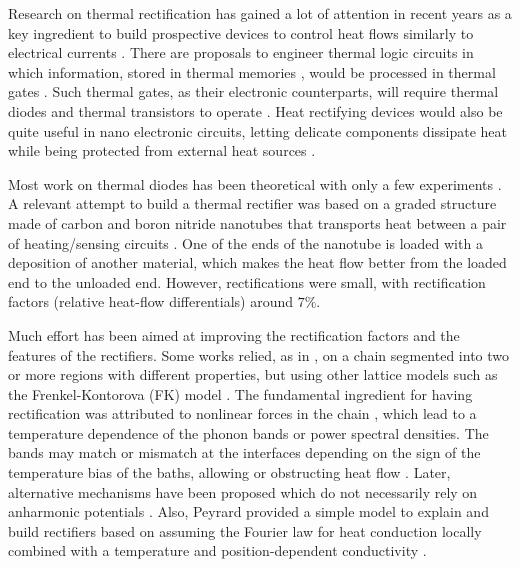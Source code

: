 Research on thermal rectification has gained a lot of attention in recent years as a key ingredient to build
prospective devices to control heat flows similarly to electrical currents \cite{Roberts2011,Li2012}. There are  proposals
to engineer thermal logic circuits \cite{Ye2017} in which information, stored in thermal memories \cite{Wang2008}, would be processed in thermal gates \cite{Wang2007}. Such thermal gates, as their electronic counterparts,  will require thermal diodes and thermal transistors  to operate \cite{Li2006,Joulain2016}.
Heat rectifying devices would also be quite useful  in nano electronic circuits, letting delicate components dissipate heat while being protected from external heat sources \cite{Roberts2011}.

Most work on thermal diodes has been theoretical with only a few experiments \cite{Chang2006,Kobayashi2009,Leitner2013,Elzouka2017}.
A relevant attempt to build a thermal rectifier was based on a graded structure made of carbon and boron nitride nanotubes that transports heat between a pair of heating/sensing circuits \cite{Chang2006}. One of the ends of the nanotube is loaded with a deposition of another material, which makes the heat flow better from the loaded end to the unloaded end. However, rectifications were small, with rectification factors (relative
heat-flow differentials) around $7\%$.

Much effort has been aimed at improving the rectification factors and the features of the rectifiers. Some works
relied, as in \cite{Terraneo2002}, on a chain segmented into two or more regions  with different properties,  but using other lattice models such as the Frenkel-Kontorova (FK) model \cite{Li2008,Hu2006}.
The fundamental ingredient for having rectification  was attributed to nonlinear forces in the chain \cite{Zeng2008,Katz2016,Li2008,Hu2006,Benenti2016,Li2012}, which lead to a temperature dependence of the phonon bands or power spectral densities. The bands may match or mismatch at the
interfaces depending on the sign of the temperature bias of the baths, allowing or obstructing heat flow \cite{Terraneo2002,Li2004}.  Later, alternative mechanisms have been
proposed which do not necessarily rely on anharmonic potentials \cite{Pereira2017,Pons2017}.
Also, Peyrard provided a simple model to explain and build rectifiers based on assuming the Fourier law for heat conduction locally
combined with a temperature and position-dependent conductivity \cite{Peyrard2006}.


